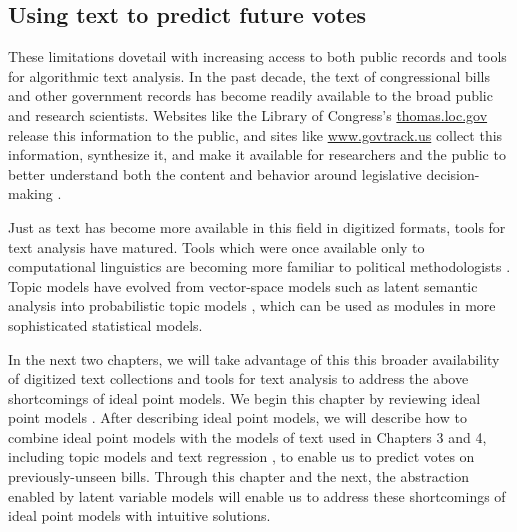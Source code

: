 

\subsection*{Using text to predict future votes}

These limitations dovetail with increasing access to both public
records and tools for algorithmic text analysis.  In the past decade,
the text of congressional bills and other government records has
become readily available to the broad public and research scientists.
Websites like the Library of Congress's \url{thomas.loc.gov} release
this information to the public, and sites like \url{www.govtrack.us}
collect this information, synthesize it, and make it available for
researchers and the public to better understand both the content and
behavior around legislative decision-making \citep{govtrack:2009}.

Just as text has become more available in this field in digitized
formats, tools for text analysis have matured.  Tools which were once
available only to computational linguistics are becoming more familiar
to political methodologists \citep{zimmer:2012}.  Topic models have
evolved from vector-space models such as latent semantic analysis
\citep{deerwester:1990} into probabilistic topic models
\citep{hofmann:1999,blei:2003}, which can be used as modules in more
sophisticated statistical models.

In the next two chapters, we will take advantage of this this broader
availability of digitized text collections and tools for text analysis
to address the above shortcomings of ideal point models.  We begin this
chapter by reviewing ideal point models
\citep{poole:1985,poole:1991,jackman:2001,martin:2002,clinton:2004}.
After describing ideal point models, we will describe how to combine
ideal point models with the models of text used in Chapters 3 and 4,
including topic models \citep{blei:2003} and text regression \citep{kogan:2009}, to
enable us to predict votes on previously-unseen bills.  Through this
chapter and the next, the abstraction enabled by latent variable
models will enable us to address these shortcomings of ideal point
models with intuitive solutions.

